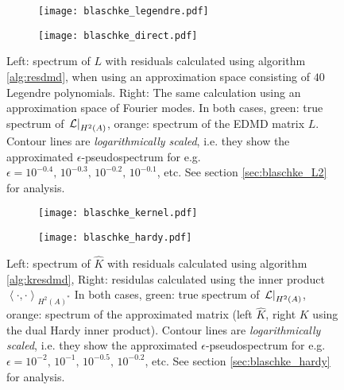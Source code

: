 \begin{figure}
    \centering
    \begin{subfigure}{0.45\textwidth}
        \centering
        \texttt{[image: blaschke\_legendre.pdf]}
    \end{subfigure}
    \hfill
    \begin{subfigure}{0.45\textwidth}
        \centering
        \texttt{[image: blaschke\_direct.pdf]}
    \end{subfigure}
    \caption{
        Left: spectrum of $L$ with residuals calculated using algorithm \ref{alg:resdmd}, 
        when using an approximation space consisting of $40$ Legendre polynomials. 
        Right: The same calculation using an approximation space of Fourier modes. 
        In both cases, green: true spectrum of $\left. \mathcal{L} \right|_{H^2(A)}$, 
        orange: spectrum of the EDMD matrix $L$. Contour lines are 
        \emph{logarithmically scaled}, i.e. they show the approximated 
        $\epsilon$-pseudospectrum for e.g. 
        $\epsilon = 10^{-0.4},\, 10^{-0.3},\, 10^{-0.2},\, 10^{-0.1}$, etc.
        See section \ref{sec:blaschke_L2} for analysis. 
    }\label{fig:blaschke_L2}
\end{figure}

\begin{figure}
    \centering
    \begin{subfigure}{0.45\textwidth}
        \centering
        \texttt{[image: blaschke\_kernel.pdf]}
    \end{subfigure}
    \hfill
    \begin{subfigure}{0.45\textwidth}
        \centering
        \texttt{[image: blaschke\_hardy.pdf]}
    \end{subfigure}
    \caption{
        Left: spectrum of $\widehat{ K }$ with residuals calculated using algorithm \ref{alg:kresdmd}, 
        Right: residulas calculated using the inner product 
        $\left\langle \cdot, \cdot \right\rangle_{H^2 (A)^*}$
        In both cases, green: true spectrum of $\left. \mathcal{L} \right|_{H^2(A)}$, 
        orange: spectrum of the approximated matrix (left $\widehat{ K }$, right $K$ using 
        the dual Hardy inner product). Contour lines are 
        \emph{logarithmically scaled}, i.e. they show the approximated 
        $\epsilon$-pseudospectrum for e.g. 
        $\epsilon = 10^{-2},\, 10^{-1},\, 10^{-0.5},\, 10^{-0.2}$, etc.
        See section \ref{sec:blaschke_hardy} for analysis. 
    }\label{fig:blaschke_other}
\end{figure}

